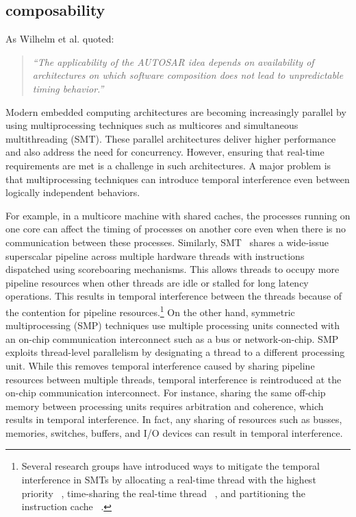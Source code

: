 \subsection{composability}
As Wilhelm et al. \cite{wilhelm2009} quoted:
\begin{quote} \textit{
  ``The applicability of the AUTOSAR idea depends on availability of
  architectures on which software composition does not lead to
  unpredictable timing behavior.''
}
\end{quote}


Modern embedded computing architectures are becoming increasingly parallel by using multiprocessing techniques such as multicores and simultaneous multithreading (SMT).
These parallel architectures deliver higher performance and also address the need for concurrency.
However, ensuring that real-time requirements are met is a challenge in such architectures. 
A major problem is that multiprocessing techniques can introduce temporal interference even between logically independent behaviors.

For example, in a multicore machine with shared caches, the processes running on one core can affect the timing of processes on another core even when there is no communication between these processes.
Similarly, SMT~\cite{Eggers97simultaneousmultithreading} shares a wide-issue superscalar pipeline across multiple hardware threads with instructions dispatched using scoreboaring mechanisms.
This allows threads to occupy more pipeline resources when other threads are idle or stalled for long latency operations. 
This results in temporal interference between the threads because of the contention for pipeline
resources.\footnote{
Several research groups have introduced ways to mitigate the temporal interference in SMTs by allocating a real-time thread with the highest priority ~\cite{Barre2008RTSMT}, time-sharing the real-time thread ~\cite{Mische2008SMT}, and partitioning the instruction cache ~\cite{Metzlaff2008MethodcacheSMIT}.}
On the other hand, symmetric multiprocessing (SMP) techniques use multiple processing units connected with an on-chip communication interconnect such as a bus or network-on-chip.
SMP exploits thread-level parallelism by designating a thread to a different processing unit.
While this removes temporal interference caused by sharing pipeline resources between multiple threads, temporal interference is reintroduced at the on-chip communication interconnect.
For instance, sharing the same off-chip memory between processing units requires arbitration and coherence, which results in temporal interference.
In fact, any sharing of resources such as busses, memories, switches, buffers, and I/O devices can
result in temporal interference.

